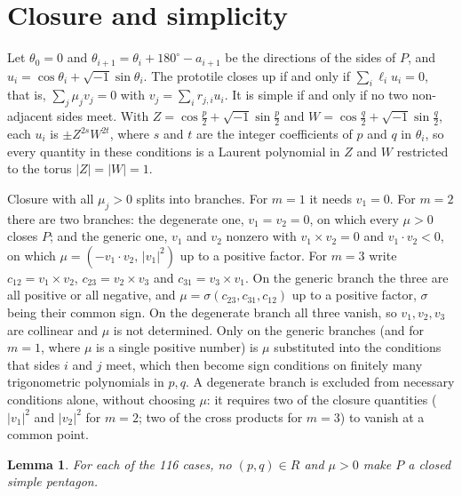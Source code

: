 \documentclass[11pt]{article}
\newtheorem{lemma}[theorem]{Lemma}
\theoremstyle{definition}
\theoremstyle{remark}
\begin{document}
\section{Closure and simplicity}\label{sec:closure}

Let $\theta_0=0$ and $\theta_{i+1}=\theta_i+180^\circ-a_{i+1}$ be the
directions of the sides of $P$, and $u_i=\cos\theta_i+\sqrt{-1}\sin\theta_i$. The prototile closes
up if and only if $\sum_i\ell_iu_i=0$, that is, $\sum_j\mu_jv_j=0$ with
$v_j=\sum_i r_{j,i}u_i$. It is simple if and only if no two non-adjacent
sides meet. With $Z=\cos\frac p2+\sqrt{-1}\sin\frac p2$ and $W=\cos\frac q2+\sqrt{-1}\sin\frac q2$, each
$u_i$ is $\pm Z^{2s}W^{2t}$, where $s$ and $t$ are the integer coefficients
of $p$ and $q$ in $\theta_i$, so every quantity in these conditions is a
Laurent polynomial in $Z$ and $W$ restricted to the torus $|Z|=|W|=1$.

Closure with all $\mu_j>0$ splits into branches. For $m=1$ it needs
$v_1=0$. For $m=2$ there are two branches: the degenerate one, $v_1=v_2=0$,
on which every $\mu>0$ closes $P$; and the generic one, $v_1$ and $v_2$
nonzero with $v_1\times v_2=0$ and $v_1\cdot v_2<0$, on which
$\mu=(-v_1\cdot v_2,\,|v_1|^2)$ up to a positive factor. For $m=3$ write
$c_{12}=v_1\times v_2$, $c_{23}=v_2\times v_3$ and $c_{31}=v_3\times v_1$.
On the generic branch the three are all positive or all negative, and
$\mu=\sigma(c_{23},c_{31},c_{12})$ up to a positive factor, $\sigma$ being
their common sign. On the degenerate branch all three vanish, so
$v_1,v_2,v_3$ are collinear and $\mu$ is not determined. Only on the
generic branches (and for $m=1$, where $\mu$ is a single positive number)
is $\mu$ substituted into the conditions that sides $i$ and $j$ meet, which
then become sign conditions on finitely many trigonometric polynomials in
$p,q$. A degenerate branch is excluded from necessary conditions alone,
without choosing $\mu$: it requires two of the closure quantities
($|v_1|^2$ and $|v_2|^2$ for $m=2$; two of the cross products for $m=3$)
to vanish at a common point.

\begin{lemma}\label{lem:closure}
For each of the 116 cases, no $(p,q)\in R$ and $\mu>0$ make $P$ a closed
simple pentagon.
\end{lemma}
\end{document}

